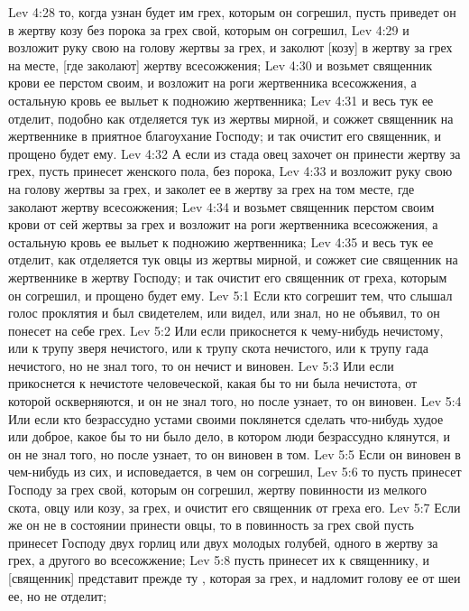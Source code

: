\vs Lev 4:28 то, когда узнан будет им грех, которым он согрешил, пусть приведет он в жертву козу без порока за грех свой, которым он согрешил,
\vs Lev 4:29 и возложит руку свою на голову жертвы за грех, и заколют [козу] в жертву за грех на месте, [где заколают] жертву всесожжения;
\vs Lev 4:30 и возьмет священник крови ее перстом своим, и возложит на роги жертвенника всесожжения, а остальную кровь ее выльет к подножию жертвенника;
\vs Lev 4:31 и весь тук ее отделит, подобно как отделяется тук из жертвы мирной, и сожжет  священник на жертвеннике в приятное благоухание Господу; и так очистит его священник, и прощено будет ему.
\vs Lev 4:32 А если из стада овец захочет он принести жертву за грех, пусть принесет женского пола, без порока,
\vs Lev 4:33 и возложит руку свою на голову жертвы за грех, и заколет ее в жертву за грех на том месте, где заколают жертву всесожжения;
\vs Lev 4:34 и возьмет священник перстом своим крови от сей жертвы за грех и возложит на роги жертвенника всесожжения, а остальную кровь ее выльет к подножию жертвенника;
\vs Lev 4:35 и весь тук ее отделит, как отделяется тук овцы из жертвы мирной, и сожжет сие священник на жертвеннике в жертву Господу; и так очистит его священник от греха, которым он согрешил, и прощено будет ему.
\vs Lev 5:1 Если кто согрешит тем, что слышал голос проклятия и был свидетелем, или видел, или знал, но не объявил, то он понесет на себе грех.
\vs Lev 5:2 Или если прикоснется к чему-нибудь нечистому, или к трупу зверя нечистого, или к трупу скота нечистого, или к трупу гада нечистого, но не знал того, то он нечист и виновен.
\vs Lev 5:3 Или если прикоснется к нечистоте человеческой, какая бы то ни была нечистота, от которой оскверняются, и он не знал того, но после узнает, то он виновен.
\vs Lev 5:4 Или если кто безрассудно устами своими поклянется сделать что-нибудь худое или доброе, какое бы то ни было дело, в котором люди безрассудно клянутся, и он не знал того, но после узнает, то он виновен в том.
\vs Lev 5:5 Если он виновен в чем-нибудь из сих, и исповедается, в чем он согрешил,
\vs Lev 5:6 то пусть принесет Господу за грех свой, которым он согрешил, жертву повинности из мелкого скота, овцу или козу, за грех, и очистит его священник от греха его.
\vs Lev 5:7 Если же он не в состоянии принести овцы, то в повинность за грех свой пусть принесет Господу двух горлиц или двух молодых голубей, одного в жертву за грех, а другого во всесожжение;
\vs Lev 5:8 пусть принесет их к священнику, и [священник] представит прежде ту , которая за грех, и надломит голову ее от шеи ее, но не отделит;
